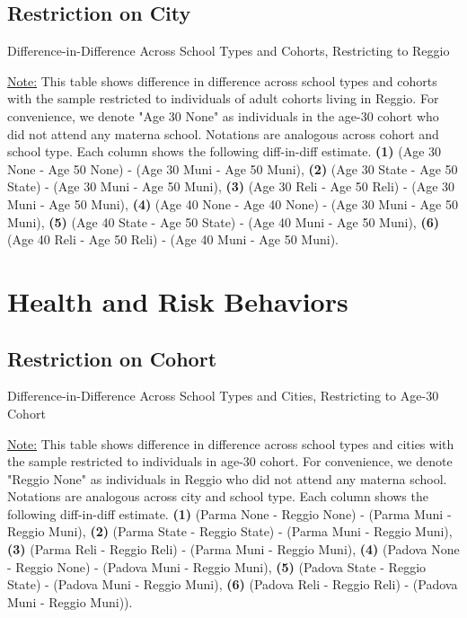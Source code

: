 \documentclass[11pt]{article}
\begin{document}
\subsection{Restriction on City}
\begin{table}[H]
\begin{center}
	\caption{Difference-in-Difference Across School Types and Cohorts, Restricting to Reggio}
	\scalebox{0.80}{
		}
\end{center}
\footnotesize
\underline{Note:} This table shows difference in difference across school types and cohorts with the sample restricted to individuals of adult cohorts living in Reggio. For convenience, we denote "Age 30 None" as individuals in the age-30 cohort who did not attend any materna school. Notations are analogous across cohort and school type. Each column shows the following diff-in-diff estimate. \textbf{(1)} (Age 30 None - Age 50 None) - (Age 30 Muni - Age 50 Muni), \textbf{(2)} (Age 30 State - Age 50 State) - (Age 30 Muni - Age 50 Muni), \textbf{(3)} (Age 30 Reli - Age 50 Reli) - (Age 30 Muni - Age 50 Muni), \textbf{(4)} (Age 40 None - Age 40 None) - (Age 30 Muni - Age 50 Muni),  \textbf{(5)} (Age 40 State - Age 50 State) - (Age 40 Muni - Age 50 Muni), \textbf{(6)} (Age 40 Reli - Age 50 Reli) - (Age 40 Muni - Age 50 Muni). 
\end{table}



\section{Health and Risk Behaviors}
\subsection{Restriction on Cohort}
\begin{table}[H]
\begin{center}
	\caption{Difference-in-Difference Across School Types and Cities, Restricting to Age-30 Cohort}
	\scalebox{0.80}{
		}
\end{center}
\footnotesize
\underline{Note:} This table shows difference in difference across school types and cities with the sample restricted to individuals in age-30 cohort. For convenience, we denote "Reggio None" as individuals in Reggio who did not attend any materna school. Notations are analogous across city and school type. Each column shows the following diff-in-diff estimate. \textbf{(1)} (Parma None - Reggio None) - (Parma Muni - Reggio Muni), \textbf{(2)} (Parma State - Reggio State) - (Parma Muni - Reggio Muni), \textbf{(3)} (Parma Reli - Reggio Reli) - (Parma Muni - Reggio Muni), \textbf{(4)} (Padova None - Reggio None) - (Padova Muni - Reggio Muni),  \textbf{(5)} (Padova State - Reggio State) - (Padova Muni - Reggio Muni), \textbf{(6)} (Padova Reli - Reggio Reli) - (Padova Muni - Reggio Muni)). 
\end{table}
\end{document}
